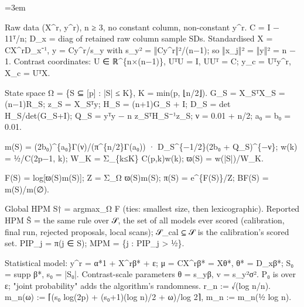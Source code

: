 \documentclass[11pt]{report}
\newenvironment{mdblock}{\begingroup\mdfont\raggedright\setlength{\parindent}{0pt}\setlength{\parskip}{0.55em}\emergencystretch=3em}{\par\endgroup}
\newcommand{\mdhead}[2]{\par\vspace{0.7em}\noindent{\bfseries\ifcase#1\or\large\or\normalsize\or\normalsize\or\small\or\small\or\small\fi #2}\par\nopagebreak\vspace{0.1em}}
\begin{document}
\begin{mdblock}
\begin{mdbul}
\item Raw data (X\textasciicircum{}r, y\textasciicircum{}r), n ≥ 3, no constant column, non-constant y\textasciicircum{}r. C = I − 11ᵀ/n; D\_x = diag of retained raw column sample SDs. Standardised X = CX\textasciicircum{}rD\_x⁻¹, y = Cy\textasciicircum{}r/s\_y with s\_y² = ‖Cy\textasciicircum{}r‖²/(n−1); so ‖x\_j‖² = ‖y‖² = n − 1. Contrast coordinates: U ∈ ℝ\textasciicircum{}\{n×(n−1)\}, UᵀU = I, UUᵀ = C; y\_c = Uᵀy\textasciicircum{}r, X\_c = UᵀX.
\item State space Ω = \{S ⊆ [p] : |S| ≤ K\}, K = min(p, ⌊n/2⌋). G\_S = X\_SᵀX\_S = (n−1)R\_S; z\_S = X\_Sᵀy; H\_S = (n+1)G\_S + I; D\_S = det H\_S/det(G\_S+I); Q\_S = yᵀy − n z\_SᵀH\_S⁻¹z\_S; ν = 0.01 + n/2; a₀ = b₀ = 0.01.
\item m(S) = (2b₀)\textasciicircum{}\{a₀\}Γ(ν)/(π\textasciicircum{}\{n/2\}Γ(a₀)) · D\_S\textasciicircum{}\{−1/2\}(2b₀ + Q\_S)\textasciicircum{}\{−ν\}; w(k) = ½/C(2p−1, k); W\_K = Σ\_\{k≤K\} C(p,k)w(k); ϖ(S) = w(|S|)/W\_K.
\item F(S) = log[ϖ(S)m(S)]; Z = Σ\_Ω ϖ(S)m(S); π(S) = e\textasciicircum{}\{F(S)\}/Z; BF(S) = m(S)/m(∅).
\item Global HPM S† = argmax\_Ω F (ties: smallest size, then lexicographic). Reported HPM Ŝ = the same rule over 𝒮, the set of all models ever scored (calibration, final run, rejected proposals, local scans); 𝒮\_cal ⊆ 𝒮 is the calibration's scored set. PIP\_j = π(j ∈ S); MPM = \{j : PIP\_j > ½\}.
\item Statistical model: y\textasciicircum{}r = α*1 + X\textasciicircum{}rβ* + ε; μ = CX\textasciicircum{}rβ* = Xθ*, θ* = D\_xβ*; S₀ = supp β*, s₀ = |S₀|. Contrast-scale parameters θ = s\_yβ, v = s\_y²σ². P₀ is over ε; "joint probability" adds the algorithm's randomness. r\_n := √(log n/n). m\_n(ω) := ⌈(s₀ log(2p) + (s₀+1)(log n)/2 + ω)/log 2⌉, m\_n := m\_n(½ log n).
\end{mdbul}

\mdhead{2}{2. Sampler objects}


\end{mdblock}
\end{document}
